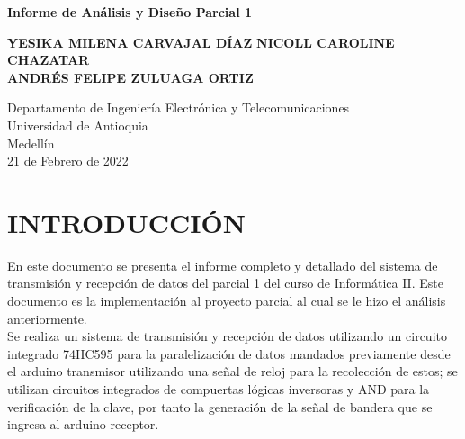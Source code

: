 \documentclass{article}
\begin{document}
\begin{titlepage}
    \begin{center}
        \vspace*{1cm}
            
        \Huge
        \textbf{Informe de Análisis y Diseño Parcial 1}
            
        \vspace{0.5cm}
        \LARGE
            
        \vspace{1.5cm}
            
        \textbf{YESIKA MILENA CARVAJAL DÍAZ}
        \textbf{NICOLL CAROLINE CHAZATAR}\\
        \textbf{ANDRÉS FELIPE ZULUAGA ORTIZ}
            
        \vfill
            
        \vspace{0.8cm}
            
        \Large
        Departamento de Ingeniería Electrónica y Telecomunicaciones\\
        Universidad de Antioquia\\
        Medellín\\
        21 de Febrero de 2022
            
    \end{center}
\end{titlepage}

\tableofcontents
\newpage

\section{INTRODUCCIÓN}
En este documento se presenta el informe completo y detallado del sistema de transmisión y recepción de datos del parcial 1 del curso de Informática II. Este documento es la implementación al proyecto parcial al cual se le hizo el análisis anteriormente.\\

Se realiza un sistema de transmisión y recepción de datos utilizando un circuito integrado 74HC595 para la paralelización de datos mandados previamente desde el arduino transmisor utilizando una señal de reloj para la recolección de estos; se utilizan circuitos integrados de compuertas lógicas inversoras y AND para la verificación de la clave, por tanto la generación de la señal de bandera que se ingresa al arduino receptor. \\
\end{document}
